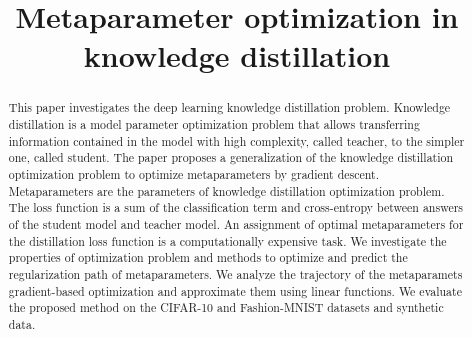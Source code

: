 \documentclass[runningheads]{llncs}
\begin{document}
%
\title{Metaparameter optimization in knowledge distillation}%
%
%
%
%
%
\maketitle              %
%
\begin{abstract}
This paper investigates the deep learning knowledge distillation problem. Knowledge distillation is a model parameter optimization problem that allows transferring information contained in the model with high complexity, called teacher, to the simpler one, called student. The paper proposes a generalization of the knowledge distillation optimization problem to optimize metaparameters by gradient descent. Metaparameters are the parameters of knowledge distillation optimization problem. The loss function is a sum of the classification term and cross-entropy between answers of the student model and teacher model. An assignment of optimal metaparameters for the distillation loss function is a computationally expensive task. We investigate the properties of optimization problem and methods to optimize and predict the regularization path of metaparameters. We analyze the trajectory of the metaparamets gradient-based optimization and approximate them using linear functions.  We evaluate the proposed method on the CIFAR-10 and Fashion-MNIST datasets and synthetic data.

\end{abstract}
%
%
%
\end{document}
